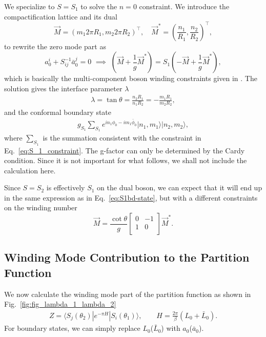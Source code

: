 We specialize to $S = S_1$ to solve the $ n = 0$ constraint. We introduce the compactification lattice and its dual\cite{affleck_quantum_2001,oshikawa_boundary_2010}
\begin{equation}
\label{eq:lattice}
\vec{M} = (m_1 2 \pi R_1, m_2 2\pi  R_2)^\top, \quad  \vec{M}^* = (\frac{n_1}{R_1}, \frac{n_2}{R_2})^\top,
\end{equation}
to rewrite the zero mode part as 
\begin{equation}
  a_0^i + S^{-1} _{ij} \bar{a}_{0}^j = 0 \,\, \implies \,\, ( \vec{M} + \frac{1}{g}\vec{M}^* ) = S_1 ( -\vec{M} + \frac{1}{g}\vec{M}^* ),
\end{equation}
which is basically the multi-component boson winding constraints given in . The solution gives the interface parameter $\lambda$
\begin{equation}
\begin{aligned}
\label{eq:S_1_constraint}
\lambda = \tan\theta=\frac{n_2R_1}{n_1R_2}=-\frac{m_1R_1}{m_2R_2},
\end{aligned}
\end{equation}
and the conformal boundary state
\begin{equation}\begin{aligned}
\label{eq:S1bd-state}
g_{S_1}\sum_{S_1}e^{in_1\phi_0-im_1\bar{\phi}_0}|n_1,m_1\rangle|n_2,m_2\rangle,
\end{aligned}\end{equation}
where $\sum_{S_1}$ is the summation consistent with the constraint in Eq.~\eqref{eq:S_1_constraint}. The g-factor can only be determined by the Cardy condition\cite{cardy_boundary_2004}. Since it is not important for what follows, we shall not include the calculation here. 

Since $S = S_2$ is effectively $S_1$ on the dual boson, we can expect that it will end up in the same expression as in Eq.~\eqref{eq:S1bd-state}, but with a different constraints on the winding number
\begin{equation}
\vec{M} = \frac{\cot \theta}{g} 
\begin{bmatrix}
0 & -1\\
1 & 0 \\                                
\end{bmatrix}
\vec{M}^*.
\end{equation}



\subsection{Winding Mode Contribution to the Partition Function}
\label{app_sub:winding_contribution}
We now calculate the winding mode part of the partition function as shown in Fig.~\ref{fig:fig_lambda_1_lambda_2}
\begin{equation}\begin{aligned}
Z=\langle S_j( \theta_2 )|e^{-\pi H}|S_i(\theta_1 )\rangle,\qquad H=\frac{2\pi}{\beta}(L_0+\bar{L}_0).
\end{aligned}\end{equation}
For boundary states, we can simply replace $L_0$($\bar{L}_0$) with $a_0$($\bar{a}_0$). 


